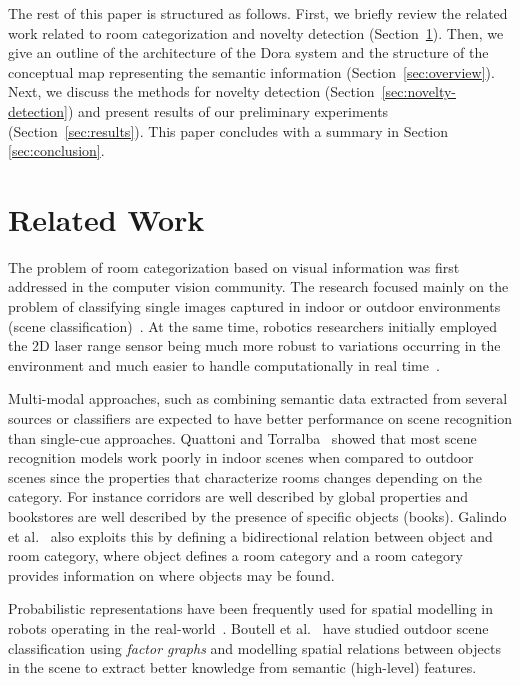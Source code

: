 \documentclass[runningheads,a4paper]{llncs}
\begin{document}
The rest of this paper is structured as follows. First, we briefly review the related work related to
room categorization and novelty detection (Section~\ref{sec:related}). Then, we give an outline of the 
architecture of the Dora system and the structure of the conceptual map representing the semantic information
(Section~\ref{sec:overview}). Next, we discuss the methods for novelty detection (Section~\ref{sec:novelty-detection}) 
and present results of our preliminary experiments (Section~\ref{sec:results}). This paper concludes with a 
summary in Section \ref{sec:conclusion}.


\section{Related Work}
\label{sec:related}
The problem of room categorization based on visual information was first addressed
in the computer vision community. The research focused mainly on the
problem of classifying single images captured in indoor or outdoor environments
(scene classification)~\cite{oliva2006building,torralba2003contextual}.
At the same time, robotics researchers initially employed
the 2D laser range sensor being much more robust to variations occurring in the
environment and much easier to handle computationally in real time~\cite{mozos2005supervised}.

Multi-modal approaches, such as combining semantic data extracted from
several sources or classifiers are expected to have better performance on scene
recognition than single-cue approaches. Quattoni and Torralba~\cite{quattoni2009recognizing}
showed that most scene recognition models work poorly in indoor scenes when
compared to outdoor scenes since the properties that
characterize rooms changes depending on the category. For instance corridors are well
described by global properties and bookstores are well described by the presence of
specific objects (books).
Galindo et al.~\cite{galindo2005multi} also exploits this by defining a bidirectional relation
between object and room category, where object defines a room category and a room
category provides information on where objects may be found.

Probabilistic representations have been frequently used for spatial modelling
in robots operating in the real-world~\cite{gross2009toomas,maier2010probabilistic}.
Boutell et al.~\cite{boutell2006factor} have studied outdoor scene classification using
\emph{factor graphs} and modelling spatial relations between objects in the scene
to extract better knowledge from semantic (high-level) features.
\end{document}
